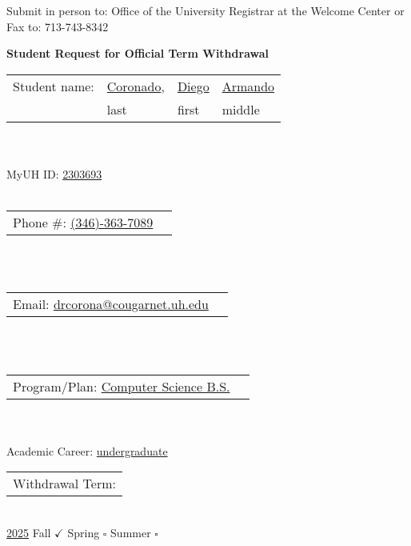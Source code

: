 \documentclass[11pt]{article}
\makeatletter
\newcommand{\lastName}{Coronado}
\newcommand{\firstName}{Diego}
\newcommand{\middleName}{Armando}
\newcommand{\studentID}{2303693}
\newcommand{\phoneNumber}{(346)-363-7089}
\newcommand{\emailAddress}{drcorona@cougarnet.uh.edu}
\newcommand{\programPlan}{Computer Science B.S.}
\newcommand{\academicCareer}{undergraduate}
\newcommand{\withdrawalYear}{2025}
\newcommand{\seasonFall}{\checkmark}
\newcommand{\seasonSpring}{\square}
\newcommand{\seasonSummer}{\square}
\makeatother
\begin{document}
\thispagestyle{empty}

\begin{minipage}{1\textwidth}
  Submit in person to:
  Office of the University Registrar at
  the Welcome Center
  or
  Fax to: 713-743-8342
\end{minipage}

\begin{center}
  \textbf{\Large Student Request for Official Term Withdrawal}
\end{center}

\noindent\begin{tabular}{@{}p{1.2in}p{1in}p{1in}p{1in}@{}} 
Student name: & \underline{\lastName}, & \underline{\firstName} & \underline{\middleName}\\
 & \scriptsize{last} & \scriptsize{first} & \scriptsize{middle}\\
\end{tabular}
\\\\
\hfill MyUH ID: \underline{\studentID}
\\\\
\noindent\begin{tabular}{@{}p{2in}p{2in}@{}}
  Phone \#:   \underline{\phoneNumber} \\
\end{tabular}
\\\\
\noindent\begin{tabular}{@{}p{3in}p{4.5in}@{}}
Email: \underline{\emailAddress} \\
\end{tabular}
\\\\
\noindent\begin{tabular}{@{}p{3in}p{4.5in}@{}}
Program/Plan:  \underline{\programPlan} \\
\end{tabular}
\\\\
\hfill Academic Career: \underline{\academicCareer}
\\

\noindent\begin{tabular}{@{}p{1.8in}@{}}
Withdrawal Term: \\
\end{tabular}
\\
\underline{\withdrawalYear} \hspace{0.2in} Fall $\seasonFall$ \hspace{0.2in} Spring $\seasonSpring$ \hspace{0.2in} Summer $\seasonSummer$
\end{document}
